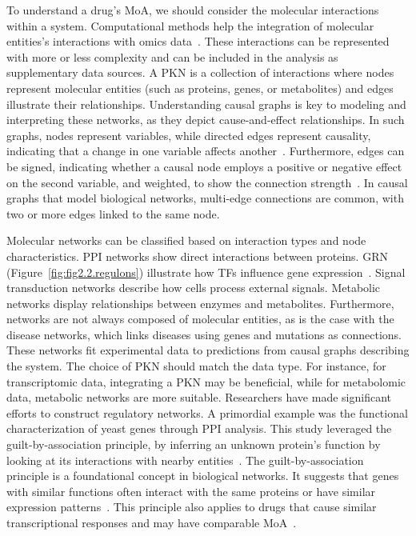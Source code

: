 To understand a drug's \gls{MoA}, we should consider the molecular interactions within a system.
Computational methods help the integration of molecular entities's interactions with omics data~\cite{RN38}.
These interactions can be represented with more or less complexity and can be included in the analysis as supplementary data sources. 
A \gls{PKN} is a collection of interactions where nodes represent molecular entities (such as proteins, genes, or metabolites) and edges illustrate their relationships. 
Understanding causal graphs is key to modeling and interpreting these networks, as they depict cause-and-effect relationships. 
In such graphs, nodes represent variables, while directed edges represent causality, indicating that a change in one variable affects another~\cite{RN37}. 
Furthermore, edges can be signed, indicating whether a causal node employs a positive or negative effect on the second variable, and weighted, to show the connection strength~\cite{RN37}. 
In causal graphs that model biological networks, multi-edge connections are common, with two or more edges linked to the same node. 

\gls{Molecular network}s can be classified based on interaction types and node characteristics. \gls{PPI} networks show direct interactions between proteins. 
\gls{GRN} (Figure~\ref{fig:fig2.2.regulons}) illustrate how \gls{TF}s influence gene expression~\cite{RN145}. 
Signal transduction networks describe how cells process external signals. Metabolic networks display relationships between enzymes and metabolites. 
Furthermore, networks are not always composed of molecular entities, as is the case with the disease networks, which links diseases using genes and mutations as connections. 
These networks fit experimental data to predictions from causal graphs describing the system. The choice of \gls{PKN} should match the data type. 
For instance, for transcriptomic data, integrating a \gls{PKN} may be beneficial, while for metabolomic data, metabolic networks are more suitable. 
Researchers have made significant efforts to construct regulatory networks. A primordial example was the functional characterization of yeast genes through \gls{PPI} analysis. This study leveraged the guilt-by-association principle, by inferring an unknown protein's function by looking at its interactions with nearby entities~\cite{RN37, RN103}. 
The guilt-by-association principle is a foundational concept in biological networks. It suggests that genes with similar functions often interact with the same proteins or have similar expression patterns~\cite{RN133}. 
This principle also applies to drugs that cause similar transcriptional responses and may have comparable \gls{MoA}~\cite{RN64}.

